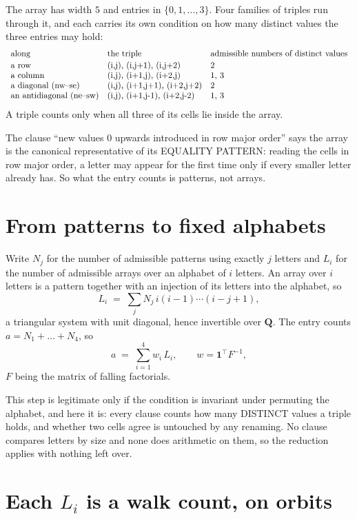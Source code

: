 \documentclass[11pt,a4paper]{article}
\theoremstyle{plain}
\theoremstyle{definition}
\begin{document}
The array has width $5$ and entries in $\{0,1,\dots,3\}$. Four families of triples
run through it, and each carries its own condition on how many distinct values the three
entries may hold:
\[
\begin{array}{lll}
\text{along} & \text{the triple} & \text{admissible numbers of distinct values} \\[2pt]
\text{a row} & $(i,j),\ (i,j+1),\ (i,j+2)$ & $2$ \\
\text{a column} & $(i,j),\ (i+1,j),\ (i+2,j)$ & $1, 3$ \\
\text{a diagonal (nw--se)} & $(i,j),\ (i+1,j+1),\ (i+2,j+2)$ & $2$ \\
\text{an antidiagonal (ne--sw)} & $(i,j),\ (i+1,j-1),\ (i+2,j-2)$ & $1, 3$ \\
\end{array}
\]
A triple counts only when all three of its cells lie inside the array.

The clause ``new values $0$ upwards introduced in row major order'' says the array is the
canonical representative of its EQUALITY PATTERN: reading the cells in row major order, a
letter may appear for the first time only if every smaller letter already has. So what the
entry counts is patterns, not arrays.

\section{From patterns to fixed alphabets}

Write $N_j$ for the number of admissible patterns using exactly $j$ letters and $L_i$ for the
number of admissible arrays over an alphabet of $i$ letters. An array over $i$ letters is a
pattern together with an injection of its letters into the alphabet, so
\[
L_i\;=\;\sum_j N_j\,i(i-1)\cdots(i-j+1),
\]
a triangular system with unit diagonal, hence invertible over $\mathbf{Q}$. The entry counts
$a=N_1+\dots+N_{4}$, so
\[
a\;=\;\sum_{i=1}^{4}w_i\,L_i ,\qquad w=\mathbf{1}^{\!\top}F^{-1},
\]
$F$ being the matrix of falling factorials.

This step is legitimate only if the condition is invariant under permuting the alphabet, and
here it is: every clause counts how many DISTINCT values a triple holds, and whether two cells
agree is untouched by any renaming. No clause compares letters by size and none does arithmetic
on them, so the reduction applies with nothing left over.

\section{Each $L_i$ is a walk count, on orbits}
\end{document}
